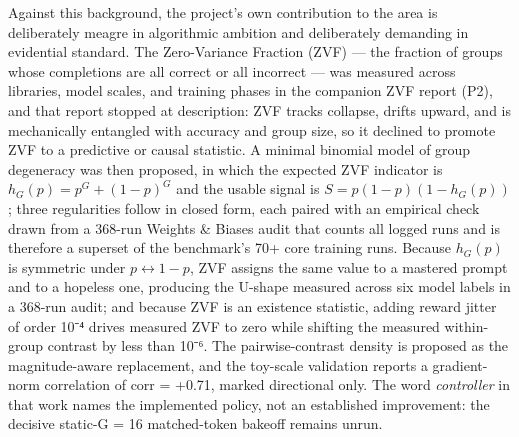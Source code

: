 \documentclass[12pt,a4paper]{report}
\begin{document}
Against this background, the project's own contribution to the area is
deliberately meagre in algorithmic ambition and deliberately demanding
in evidential standard. The Zero-Variance Fraction (ZVF) --- the
fraction of groups whose completions are all correct or all incorrect
--- was measured across libraries, model scales, and training phases in
the companion ZVF report (P2), and that report stopped at description:
ZVF tracks collapse, drifts upward, and is mechanically entangled with
accuracy and group size, so it declined to promote ZVF to a predictive
or causal statistic. A minimal binomial model of group degeneracy was
then proposed, in which the expected ZVF indicator is
\(h_G(p) = p^G + (1-p)^G\) and the usable signal is
\(S = p(1-p)(1-h_G(p))\); three regularities follow in closed form, each
paired with an empirical check drawn from a 368-run Weights \& Biases
audit that counts all logged runs and is therefore a superset of the
benchmark's 70+ core training runs. Because \(h_G(p)\) is symmetric
under \(p \leftrightarrow 1-p\), ZVF assigns the same value to a
mastered prompt and to a hopeless one, producing the U-shape measured
across six model labels in a 368-run audit; and because ZVF is an
existence statistic, adding reward jitter of order 10⁻⁴ drives measured
ZVF to zero while shifting the measured within-group contrast by less
than 10⁻⁶. The pairwise-contrast density is proposed as the
magnitude-aware replacement, and the toy-scale validation reports a
gradient-norm correlation of corr = +0.71, marked directional only. The
word \emph{controller} in that work names the implemented policy, not an
established improvement: the decisive static-G = 16 matched-token
bakeoff remains unrun.
\end{document}
